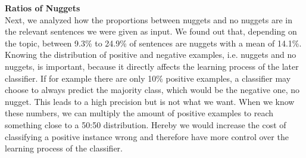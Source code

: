 \textbf{Ratios of Nuggets}\\
Next, we analyzed how the proportions between nuggets and no nuggets are in the relevant sentences we were given as input. We found out that, depending on the topic, between 9.3\% to 24.9\% of sentences are nuggets with a mean of 14.1\%. Knowing the distribution of positive and negative examples, i.e. nuggets and no nuggets, is important, because it directly affects the learning process of the later classifier. If for example there are only 10\% positive examples,  a classifier may choose to always predict the majority class, which would be the negative one, no nugget. This leads to a high precision but is not what we want. When we know these numbers, we can multiply the amount of positive examples to reach something close to a 50:50 distribution. Hereby we would increase the cost of classifying a positive instance wrong and therefore have more control over the learning process of the classifier.

